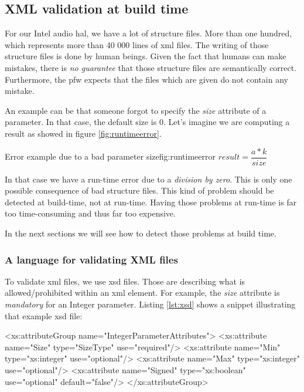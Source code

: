 \subsection{XML validation at build time}

For our Intel audio \gls{hal}, we have a lot of structure files. More than one hundred, which represents
more than 40 000 lines of \gls{xml} files.
The writing of those structure files is done by human beings. Given the fact
that humans can make mistakes, there is \emph{no guarantee} that those structure files are semantically correct.
Furthermore, the \gls{pfw} expects that the files which are given do not contain any mistake.

An example can be that someone forgot to specify the \emph{size} attribute of a parameter.
In that case, the default size is $0$. Let's imagine we are computing a result as showed in figure \ref{fig:runtimeerror}.

\begin{figureGraphics}{Error example due to a bad parameter size}{fig:runtimeerror}
    $result = \dfrac{a*k}{size}$
    \vspace{0.3cm}
\end{figureGraphics}

In that case we have a run-time error due to a \emph{division by zero}. This is only one possible consequence of bad structure files.
This kind of problem should be detected at build-time, not at run-time. Having those problems at
run-time is far too time-consuming and thus far too expensive.

In the next sections we will see how to detect those problems at build time.

\subsubsection{A language for validating XML files}

To validate \gls{xml} files, we use \gls{xsd} files.
Those are describing what is allowed/prohibited within an \gls{xml} element. For example, the \emph{size} attribute is
\emph{mandatory} for an Integer parameter.
Listing \ref{lst:xsd} shows a snippet illustrating that example \gls{xsd} file:

\begin{code}[language=XML, caption=XSD rules for an Integer parameter, label=lst:xsd]
<xs:attributeGroup name="IntegerParameterAttributes">
    <xs:attribute name="Size" type="SizeType" use="required"/>
    <xs:attribute name="Min" type="xs:integer" use="optional"/>
    <xs:attribute name="Max" type="xs:integer" use="optional"/>
    <xs:attribute name="Signed" type="xs:boolean" use="optional" default="false"/>
</xs:attributeGroup>
\end{code}

